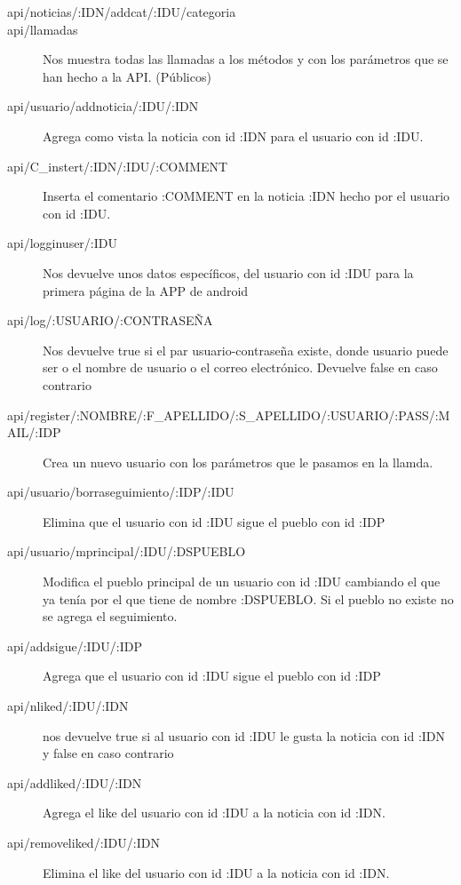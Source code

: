 \begin{description}
\item[api/noticias/:IDN/addcat/:IDU/categoria]

\item[api/llamadas]
Nos muestra todas las llamadas a los métodos y con los parámetros que se han hecho a la API. (Públicos)

\item[api/usuario/addnoticia/:IDU/:IDN]
Agrega como vista la noticia con id :IDN para el usuario con id :IDU.

\item[api/C\_instert/:IDN/:IDU/:COMMENT]
Inserta el comentario :COMMENT en la noticia :IDN hecho por el usuario con id :IDU.

\item[api/logginuser/:IDU]
Nos devuelve unos datos específicos, del usuario con id :IDU para la primera página de la APP de android 


\item[api/log/:USUARIO/:CONTRASEÑA]
Nos devuelve true si el par usuario-contraseña existe, donde usuario puede ser o el nombre de usuario o el correo electrónico. Devuelve false en caso contrario

\item[api/register/:NOMBRE/:F\_APELLIDO/:S\_APELLIDO/:USUARIO/:PASS/:MAIL/:IDP]
Crea un nuevo usuario con los parámetros que le pasamos en la llamda.

\item[api/usuario/borraseguimiento/:IDP/:IDU]
Elimina que el usuario con id :IDU sigue el pueblo con id :IDP

\item[api/usuario/mprincipal/:IDU/:DSPUEBLO]
Modifica el pueblo principal de un usuario con id :IDU cambiando el que ya tenía por el que tiene de nombre :DSPUEBLO. Si el pueblo no existe no se agrega el seguimiento.

\item[api/addsigue/:IDU/:IDP]
Agrega que el usuario con id :IDU sigue el pueblo con id :IDP

\item[api/nliked/:IDU/:IDN]
nos devuelve true si al usuario con id :IDU le gusta la noticia con id :IDN y false en caso contrario

\item[api/addliked/:IDU/:IDN]
Agrega el like del usuario con id :IDU a la noticia con id :IDN.


\item[api/removeliked/:IDU/:IDN]
Elimina el like del usuario con id :IDU a la noticia con id :IDN.


\end{description}
